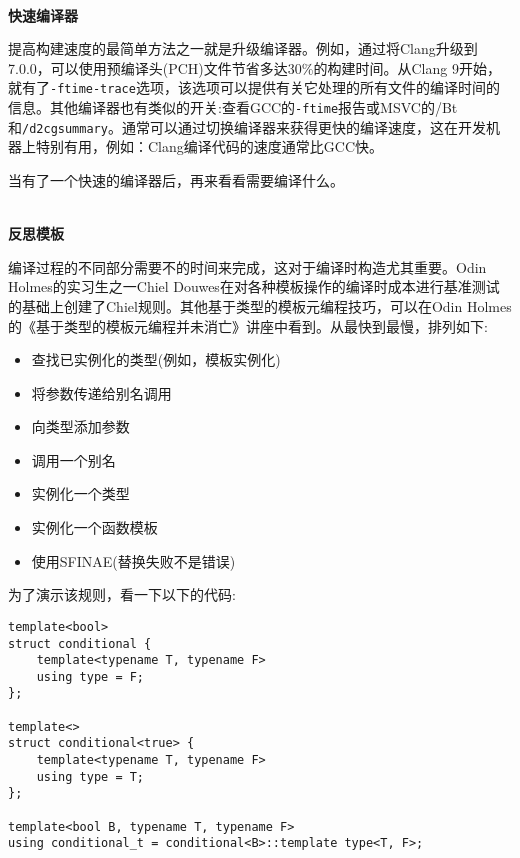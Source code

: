 \hspace*{\fill} \\ %
\noindent
\textbf{快速编译器}

提高构建速度的最简单方法之一就是升级编译器。例如，通过将Clang升级到7.0.0，可以使用预编译头(PCH)文件节省多达30\%的构建时间。从Clang 9开始，就有了\texttt{-ftime-trace}选项，该选项可以提供有关它处理的所有文件的编译时间的信息。其他编译器也有类似的开关:查看GCC的\texttt{-ftime}报告或MSVC的/Bt和\texttt{/d2cgsummary}。通常可以通过切换编译器来获得更快的编译速度，这在开发机器上特别有用，例如：Clang编译代码的速度通常比GCC快。

当有了一个快速的编译器后，再来看看需要编译什么。

\hspace*{\fill} \\ %
\noindent
\textbf{反思模板}

编译过程的不同部分需要不的时间来完成，这对于编译时构造尤其重要。Odin Holmes的实习生之一Chiel Douwes在对各种模板操作的编译时成本进行基准测试的基础上创建了Chiel规则。其他基于类型的模板元编程技巧，可以在Odin Holmes的《基于类型的模板元编程并未消亡》讲座中看到。从最快到最慢，排列如下:

\begin{itemize}
\item 
查找已实例化的类型(例如，模板实例化)

\item 
将参数传递给别名调用

\item 
向类型添加参数

\item 
调用一个别名

\item 
实例化一个类型

\item 
实例化一个函数模板

\item 
使用SFINAE(替换失败不是错误)
\end{itemize}

为了演示该规则，看一下以下的代码:

\begin{lstlisting}[style=styleCXX]
template<bool>
struct conditional {
	template<typename T, typename F>
	using type = F;
};

template<>
struct conditional<true> {
	template<typename T, typename F>
	using type = T;
};

template<bool B, typename T, typename F>
using conditional_t = conditional<B>::template type<T, F>;
\end{lstlisting}

